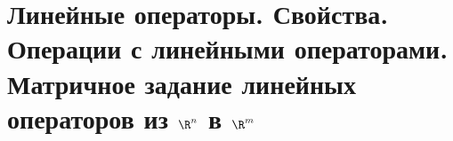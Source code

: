 \section{Линейные операторы. Свойства. Операции с линейными операторами. Матричное задание линейных операторов из $\R^n$ в $\R^m$}
